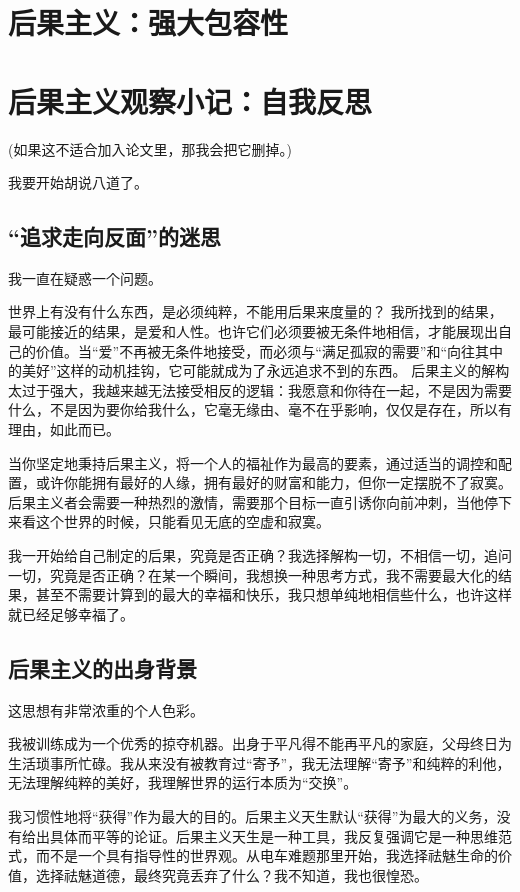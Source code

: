 \documentclass[10pt]{article}
\begin{document}
\section{后果主义：强大包容性}
    
\section{后果主义观察小记：自我反思}


    (如果这不适合加入论文里，那我会把它删掉。)
    
    我要开始胡说八道了。
    
\subsection{“追求走向反面”的迷思}

我一直在疑惑一个问题。
   
   世界上有没有什么东西，是必须纯粹，不能用后果来度量的？
  我所找到的结果，最可能接近的结果，是爱和人性。也许它们必须要被无条件地相信，才能展现出自己的价值。当“爱”不再被无条件地接受，而必须与“满足孤寂的需要”和“向往其中的美好”这样的动机挂钩，它可能就成为了永远追求不到的东西。
  后果主义的解构太过于强大，我越来越无法接受相反的逻辑：我愿意和你待在一起，不是因为需要什么，不是因为要你给我什么，它毫无缘由、毫不在乎影响，仅仅是存在，所以有理由，如此而已。
   
  当你坚定地秉持后果主义，将一个人的福祉作为最高的要素，通过适当的调控和配置，或许你能拥有最好的人缘，拥有最好的财富和能力，但你一定摆脱不了寂寞。后果主义者会需要一种热烈的激情，需要那个目标一直引诱你向前冲刺，当他停下来看这个世界的时候，只能看见无底的空虚和寂寞。
   
  我一开始给自己制定的后果，究竟是否正确？我选择解构一切，不相信一切，追问一切，究竟是否正确？在某一个瞬间，我想换一种思考方式，我不需要最大化的结果，甚至不需要计算到的最大的幸福和快乐，我只想单纯地相信些什么，也许这样就已经足够幸福了。
  
\subsection{后果主义的出身背景}
  这思想有非常浓重的个人色彩。
  
 我被训练成为一个优秀的掠夺机器。出身于平凡得不能再平凡的家庭，父母终日为生活琐事所忙碌。我从来没有被教育过“寄予”，我无法理解“寄予”和纯粹的利他，无法理解纯粹的美好，我理解世界的运行本质为“交换”。
  
  我习惯性地将“获得”作为最大的目的。后果主义天生默认“获得”为最大的义务，没有给出具体而平等的论证。后果主义天生是一种工具，我反复强调它是一种思维范式，而不是一个具有指导性的世界观。从电车难题那里开始，我选择祛魅生命的价值，选择祛魅道德，最终究竟丢弃了什么？我不知道，我也很惶恐。
\end{document}

